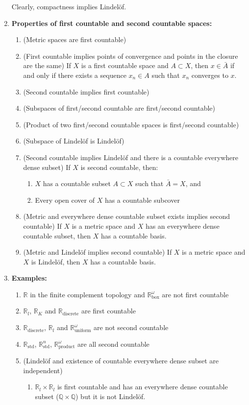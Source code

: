 \documentclass[letterpaper, 12pt]{article}
\newcommand{\RR}{\mathbb{R}}
\newcommand{\QQ}{\mathbb{Q}}
\begin{document}
\begin{enumerate}[resume]
        Clearly, compactness implies Lindel\"of.
    \item \textbf{Properties of first countable and second countable spaces:}
        \begin{enumerate}
            \item (Metric spaces are first countable)
            \item (First countable implies points of convergence and points in the closure are the same) If $X$ is a first countable space and $A\subset X$, then $x\in \bar{A}$ if and only if there exists a sequence $x_n\in A$ such that $x_n$ converges to $x$.
            \item (Second countable implies first countable)
            \item (Subspaces of first/second countable are first/second countable)
            \item (Product of two first/second countable spaces is first/second countable)
            \item (Subspace of Lindel\"of is Lindel\"of)
            \item (Second countable implies Lindel\"of and there is a countable everywhere dense subset) If $X$ is second countable, then:
                \begin{enumerate}
                \item $X$ has a countable subset $A\subset X$ such that $\bar{A} = X$, and
                \item Every open cover of $X$ has a countable subcover
                \end{enumerate}
            \item (Metric and everywhere dense countable subset exists implies second countable) If $X$ is a metric space and $X$ has an everywhere dense countable subset, then $X$ has a countable basis.
            \item (Metric and Lindel\"of implies second countable) If $X$ is a metric space and $X$ is Lindel\"of, then $X$ has a countable basis.
        \end{enumerate}
    \item \textbf{Examples:}
        \begin{enumerate}
        \item $\RR$ in the finite complement topology and $\RR^\omega_\text{box}$ are not first countable
        \item $\RR_l$, $\RR_K$ and $\RR_\text{discrete}$ are first countable
        \item $\RR_\text{discrete}$, $\RR_l$ and $\RR^\omega_\text{uniform}$ are not second countable
        \item $\RR_\text{std}$, $\RR^n_\text{std}$, $\RR^\omega_\text{product}$ are all second countable
        \item (Lindel\"of and existence of countable everywhere dense subset are independent)
            \begin{enumerate}
            \item $\RR_l\times\RR_l$ is first countable and has an everywhere dense countable subset ($\QQ\times\QQ$) but it is not Lindel\"of.


\end{enumerate}
\end{enumerate}
\end{enumerate}
\end{document}
